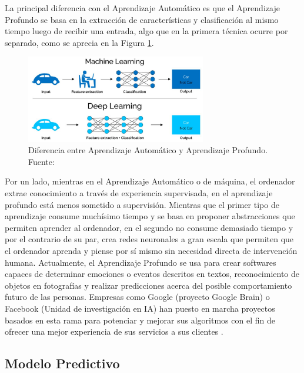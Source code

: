 La principal diferencia con el Aprendizaje Automático es que el Aprendizaje Profundo se basa en la extracción de características y clasificación al mismo tiempo luego de recibir una entrada, algo que en la primera técnica ocurre por separado, como se aprecia en la Figura \ref{2:fig5}.
\begin{figure}[!ht]
	\begin{center}
		\includegraphics[width=0.70\textwidth]{2/figures/deeplearning_machinelearning.jpg}
		\caption{Diferencia entre Aprendizaje Automático y Aprendizaje Profundo. Fuente: \cite{tec_cook2018deeplearning}}
		\label{2:fig5}
	\end{center}
\end{figure}

Por un lado, mientras en el Aprendizaje Automático o de máquina, el ordenador extrae conocimiento a través de experiencia supervisada, en el aprendizaje profundo está menos sometido a supervisión. Mientras que el primer tipo de aprendizaje consume muchísimo tiempo y se basa en proponer abstracciones que permiten aprender al ordenador, en el segundo no consume demasiado tiempo y por el contrario de su par, crea redes neuronales a gran escala que permiten que el ordenador aprenda y piense por sí mismo sin necesidad directa de intervención humana. Actualmente, el Aprendizaje Profundo se usa para crear softwares capaces de determinar emociones o eventos descritos en textos, reconocimiento de objetos en fotografías y realizar predicciones acerca del posible comportamiento futuro de las personas. Empresas como Google (proyecto Google Brain) o Facebook (Unidad de investigación en IA) han puesto en marcha proyectos basados en esta rama para potenciar y mejorar sus algoritmos con el fin de ofrecer una mejor experiencia de sus servicios a sus clientes \parencite{tec_banafa2019deeplearning}.

\subsection{Modelo Predictivo}

